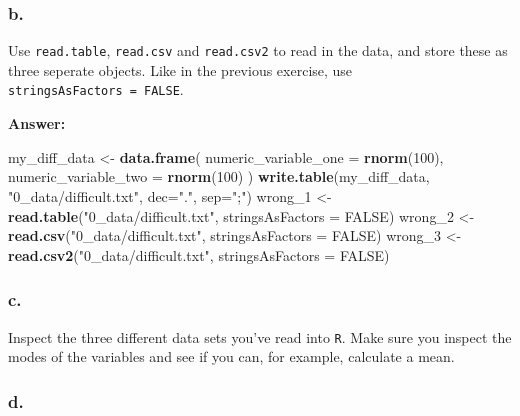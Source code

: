 \documentclass[]{article}
\newenvironment{Shaded}{\begin{snugshade}}{\end{snugshade}}
\newcommand{\DataTypeTok}[1]{\textcolor[rgb]{0.13,0.29,0.53}{#1}}
\newcommand{\DecValTok}[1]{\textcolor[rgb]{0.00,0.00,0.81}{#1}}
\newcommand{\KeywordTok}[1]{\textcolor[rgb]{0.13,0.29,0.53}{\textbf{#1}}}
\newcommand{\NormalTok}[1]{#1}
\newcommand{\OtherTok}[1]{\textcolor[rgb]{0.56,0.35,0.01}{#1}}
\newcommand{\StringTok}[1]{\textcolor[rgb]{0.31,0.60,0.02}{#1}}
\begin{document}
\hypertarget{b.-5}{%
\subsubsection{b.}\label{b.-5}}

Use \texttt{read.table}, \texttt{read.csv} and \texttt{read.csv2} to
read in the data, and store these as three seperate objects. Like in the
previous exercise, use \texttt{stringsAsFactors\ =\ FALSE}.

\textbf{Answer:}

\begin{Shaded}
\begin{Highlighting}[]
\NormalTok{my_diff_data <-}\StringTok{ }\KeywordTok{data.frame}\NormalTok{(}
  \DataTypeTok{numeric_variable_one =} \KeywordTok{rnorm}\NormalTok{(}\DecValTok{100}\NormalTok{),}
  \DataTypeTok{numeric_variable_two =} \KeywordTok{rnorm}\NormalTok{(}\DecValTok{100}\NormalTok{)}
\NormalTok{)}
\KeywordTok{write.table}\NormalTok{(my_diff_data, }\StringTok{"0_data/difficult.txt"}\NormalTok{, }\DataTypeTok{dec=}\StringTok{"."}\NormalTok{, }\DataTypeTok{sep=}\StringTok{";"}\NormalTok{)}
\NormalTok{wrong_}\DecValTok{1}\NormalTok{ <-}\StringTok{ }\KeywordTok{read.table}\NormalTok{(}\StringTok{"0_data/difficult.txt"}\NormalTok{, }\DataTypeTok{stringsAsFactors =} \OtherTok{FALSE}\NormalTok{)}
\NormalTok{wrong_}\DecValTok{2}\NormalTok{ <-}\StringTok{ }\KeywordTok{read.csv}\NormalTok{(}\StringTok{"0_data/difficult.txt"}\NormalTok{, }\DataTypeTok{stringsAsFactors =} \OtherTok{FALSE}\NormalTok{)}
\NormalTok{wrong_}\DecValTok{3}\NormalTok{ <-}\StringTok{ }\KeywordTok{read.csv2}\NormalTok{(}\StringTok{"0_data/difficult.txt"}\NormalTok{, }\DataTypeTok{stringsAsFactors =} \OtherTok{FALSE}\NormalTok{)}
\end{Highlighting}
\end{Shaded}

\hypertarget{c.-5}{%
\subsubsection{c.}\label{c.-5}}

Inspect the three different data sets you've read into \texttt{R}. Make
sure you inspect the modes of the variables and see if you can, for
example, calculate a mean.

\hypertarget{d.-5}{%
\subsubsection{d.}\label{d.-5}}
\end{document}
